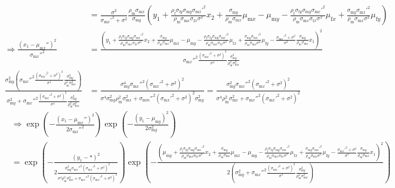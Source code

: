 \documentclass{article}\usepackage[]{graphicx}\usepackage[]{color}
\newcommand{\x}[1]{\text{#1}}
\begin{document}
\begin{landscape}
\begin{align*}
\\&=\frac{\sigma^2}{\sigma_{\x{m}x}'^2+\sigma^2}\frac{\rho_\x{m}\sigma_{\x{m}x}}{\sigma_{\x{m}y}}\left(y_1+\frac{\rho_\x{f}\sigma_{\x{f}y}\sigma_{\x{m}y}\sigma_{\x{m}x}'^2}{\rho_\x{m}\sigma_{\x{m}x}\sigma_{\x{f}x}\sigma^2}x_2+\frac{\sigma_{\x{m}y}}{\rho_\x{m}\sigma_{\x{m}x}}\mu_{\x{m}x}-\mu_{\x{m}y}-\frac{\rho_\x{f}\sigma_{\x{f}y}\sigma_{\x{m}y}\sigma_{\x{m}x}'^2}{\rho_\x{m}\sigma_{\x{m}x}\sigma_{\x{f}x}\sigma^2}\mu_{\x{f}x}+\frac{\sigma_{\x{m}y}\sigma_{\x{m}x}'^2}{\rho_\x{m}\sigma_{\x{m}x}\sigma^2}\mu_{\x{f}y}\right)
\\ \Rightarrow \frac{(x_1-\mu_{\x{m}x}'')^2}{\sigma_{\x{m}x}''^2}&=\frac{\left(y_1+\frac{\rho_\x{f}\sigma_{\x{f}y}\sigma_{\x{m}y}\sigma_{\x{m}x}'^2}{\rho_\x{m}\sigma_{\x{m}x}\sigma_{\x{f}x}\sigma^2}x_2+\frac{\sigma_{\x{m}y}}{\rho_\x{m}\sigma_{\x{m}x}}\mu_{\x{m}x}-\mu_{\x{m}y}-\frac{\rho_\x{f}\sigma_{\x{f}y}\sigma_{\x{m}y}\sigma_{\x{m}x}'^2}{\rho_\x{m}\sigma_{\x{m}x}\sigma_{\x{f}x}\sigma^2}\mu_{\x{f}x}+\frac{\sigma_{\x{m}y}\sigma_{\x{m}x}'^2}{\rho_\x{m}\sigma_{\x{m}x}\sigma^2}\mu_{\x{f}y}-\frac{\sigma_{\x{m}x}'^2+\sigma^2}{\sigma^2}\frac{\sigma_{\x{m}y}}{\rho_\x{m}\sigma_{\x{m}x}}x_1\right)^2}{\sigma_{\x{m}x}''^2\frac{(\sigma_{\x{m}x}'^2+\sigma^2)^2}{\sigma^4}\frac{\sigma_{\x{m}y}^2}{\rho_\x{m}^2\sigma_{\x{m}x}^2}}
\\ \frac{\sigma_{\x{m}y}^2\left(\sigma_{\x{m}x}''^2\frac{(\sigma_{\x{m}x}'^2+\sigma^2)^2}{\sigma^4}\frac{\sigma_{\x{m}y}^2}{\rho_\x{m}^2\sigma_{\x{m}x}^2}\right)}{\sigma_{\x{m}y}^2+\sigma_{\x{m}x}''^2\frac{(\sigma_{\x{m}x}'^2+\sigma^2)^2}{\sigma^4}\frac{\sigma_{\x{m}y}^2}{\rho_\x{m}^2\sigma_{\x{m}x}^2}}&=\frac{\sigma_{\x{m}y}^4\sigma_{\x{m}x}''^2(\sigma_{\x{m}x}'^2+\sigma^2)^2}{\sigma^4\sigma_{\x{m}y}^2\rho_\x{m}^2\sigma_{\x{m}x}^2+\sigma_{\x{m}m}''^2(\sigma_{\x{m}x}'^2+\sigma^2)^2\sigma_{\x{m}y}^2}=\frac{\sigma_{\x{m}y}^2\sigma_{\x{m}x}''^2(\sigma_{\x{m}x}'^2+\sigma^2)^2}{\sigma^4\rho_\x{m}^2\sigma_{\x{m}x}^2+\sigma_{\x{m}x}''^2(\sigma_{\x{m}x}'^2+\sigma^2)^2}
\end{align*}
\begin{align*}
&\Rightarrow \exp\left(-\frac{\left(x_1-\mu_{\x{m}x}''\right)^2}{2\sigma_{\x{m}x}''^2}\right)\exp\left(-\frac{(y_1-\mu_{\x{m}y})^2}{2\sigma_{\x{m}y}^2}\right)
\\ &=\exp\left(-\frac{(y_1-*)^2}{2\frac{\sigma_{\x{m}y}^2\sigma_{\x{m}x}''^2(\sigma_{\x{m}x}'^2+\sigma^2)^2}{\sigma^4\rho_\x{m}^2\sigma_{\x{m}x}^2+\sigma_{\x{m}x}''^2(\sigma_{\x{m}x}'^2+\sigma^2)^2}}\right)\exp\left(-\frac{\left(\mu_{\x{m}y}+\frac{\rho_\x{f}\sigma_{\x{f}y}\sigma_{\x{m}y}\sigma_{\x{m}x}'^2}{\rho_\x{m}\sigma_{\x{m}x}\sigma_{\x{f}x}\sigma^2}x_2+\frac{\sigma_{\x{m}y}}{\rho_\x{m}\sigma_{\x{m}x}}\mu_{\x{m}x}-\mu_{\x{m}y}-\frac{\rho_\x{f}\sigma_{\x{f}y}\sigma_{\x{m}y}\sigma_{\x{m}x}'^2}{\rho_\x{m}\sigma_{\x{m}x}\sigma_{\x{f}x}\sigma^2}\mu_{\x{f}x}+\frac{\sigma_{\x{m}y}\sigma_{\x{m}x}'^2}{\rho_\x{m}\sigma_{\x{m}x}\sigma^2}\mu_{\x{f}y}-\frac{\sigma_{\x{m}x}'^2+\sigma^2}{\sigma^2}\frac{\sigma_{\x{m}y}}{\rho_\x{m}\sigma_{\x{m}x}}x_1\right)^2}{2(\sigma_{\x{m}y}^2+\sigma_{\x{m}x}''^2\frac{(\sigma_{\x{m}x}'^2+\sigma^2)^2}{\sigma^4}\frac{\sigma_{\x{m}y}^2}{\rho_\x{m}^2\sigma_{\x{m}x}^2})}\right)

\end{align*}
\end{landscape}
\end{document}
